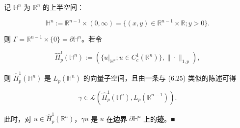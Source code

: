 \begin{remark}

记 $ \mathbb{H}^n $ 为 $ \mathbb{R}^n $ 的上半空间：

\[
\mathbb{H}^n := \mathbb{R}^{n-1}\times(0,\infty) = \{ (x,y) \in \mathbb{R}^{n-1}\times\mathbb{R} ; y > 0 \} .
\]

则 $ \Gamma = \mathbb{R}^{n-1}\times\{0\} = \partial\mathbb{H}^n $。若令

\[
\widehat{H}_p^1(\mathbb{H}^n) := ( \{ u|_{\mathbb{H}^n} ; u \in C_c^1(\mathbb{R}^n) \}, \|\cdot\|_{1,p} ) ,
\]

则 $ \widehat{H}_p^1(\mathbb{H}^n) $ 是 $ L_p(\mathbb{H}^n) $ 的向量子空间，且由一条与 (6.25) 类似的陈述可得

\[
\gamma \in \mathcal{L}(\widehat{H}_p^1(\mathbb{H}^n), L_p(\mathbb{R}^{n-1})) .
\]

此时，对 $ u \in \widehat{H}_p^1(\mathbb{R}^n) $，$ \gamma u $ 是 $ u $ 在\textbf{边界} $ \partial\mathbb{H}^n $ 上的\textbf{迹}。\nobreak\hspace{0.35em}■

\end{remark}

\exerciseshead

